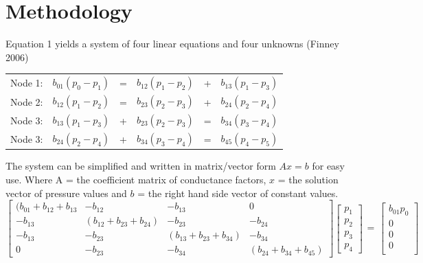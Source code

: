 \documentclass[titlepage,12pt,onehalfspacing]{article}
\begin{document}
\section{Methodology}
Equation 1 yields a system of four linear equations and four
unknowns (Finney 2006)
\begin{singlespacing}
\begin{center}
\begin{tabular}{rccccc}
Node 1:& $b_{01}(p_0-p_1)$ &=& $b_{12}(p_1-p_2)$ &+& $b_{13}(p_1-p_3)$\\
Node 2:& $b_{12}(p_1-p_2)$ &=& $b_{23}(p_2-p_3)$ &+& $b_{24}(p_2-p_4)$\\
Node 3:& $b_{13}(p_1-p_3)$ &+& $b_{23}(p_2-p_3)$ &=& $b_{34}(p_3-p_4)$\\
Node 3:& $b_{24}(p_2-p_4)$ &+& $b_{34}(p_3-p_4)$ &=& $b_{45}(p_4-p_5)$\\
\end{tabular}
\end{center}
\end{singlespacing}
The system can be simplified and written in matrix/vector form
$A$\underline{$x$}$=$\underline{$b$} for easy use.  Where A = the
coefficient matrix of conductance factors, \underline{$x$} = the
solution vector of pressure values and \underline{$b$} = the right
hand side vector of constant values.
\begin{displaymath}
\left[
\begin{array}{cccc}
(b_{01}+b_{12}+b_{13} & -b_{12} & -b_{13} & 0\\
-b_{13} & (b_{12}+b_{23}+b_{24}) & -b_{23} & -b_{24}\\
-b_{13} & -b_{23} & (b_{13}+b_{23}+b_{34}) & -b_{34}\\
0 & -b_{23} & -b_{34} & (b_{24}+b_{34}+b_{45})
\end{array}
\right]
\left[
\begin{array}{c}
p_1\\p_2\\p_3\\p_4
\end{array}
\right]
\begin{array}{c}
=
\end{array}
\left[
\begin{array}{c}
b_{01}p_0\\0\\0\\0\\
\end{array}
\right]
\end{displaymath}
\end{document}
